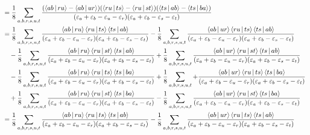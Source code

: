\documentclass[a4paper]{article}
\numberwithin{equation}{subsection}
\begin{document}
\begin{align}
&=\dfrac{1}{8} \sum_{a,b,r,s,u,t} \dfrac{(\Braket{ab|ru}-\Braket{ab|ur}) (\Braket{ru|ts}-\Braket{ru|st}) (\Braket{ts|ab}-\Braket{ts|ba})}{(\varepsilon_a + \varepsilon_b - \varepsilon_u - \varepsilon_r)(\varepsilon_a + \varepsilon_b - \varepsilon_s - \varepsilon_t)}  \notag\\
&= \dfrac{1}{8} \sum_{a,b,r,s,u,t} \dfrac{\Braket{ab|ru} \Braket{ru|ts} \Braket{ts|ab}}{(\varepsilon_a + \varepsilon_b - \varepsilon_u - \varepsilon_r)(\varepsilon_a + \varepsilon_b - \varepsilon_s - \varepsilon_t)} 
- \dfrac{1}{8} \sum_{a,b,r,s,u,t} \dfrac{\Braket{ab|ur} \Braket{ru|ts} \Braket{ts|ab}}{(\varepsilon_a + \varepsilon_b - \varepsilon_u - \varepsilon_r)(\varepsilon_a + \varepsilon_b - \varepsilon_s - \varepsilon_t)} \notag\\
&\quad{} - \dfrac{1}{8} \sum_{a,b,r,s,u,t} \dfrac{\Braket{ab|ru} \Braket{ru|st} \Braket{ts|ab}}{(\varepsilon_a + \varepsilon_b - \varepsilon_u - \varepsilon_r)(\varepsilon_a + \varepsilon_b - \varepsilon_s - \varepsilon_t)} 
+ \dfrac{1}{8} \sum_{a,b,r,s,u,t} \dfrac{\Braket{ab|ur} \Braket{ru|st} \Braket{ts|ab}}{(\varepsilon_a + \varepsilon_b - \varepsilon_u - \varepsilon_r)(\varepsilon_a + \varepsilon_b - \varepsilon_s - \varepsilon_t)} 
\notag\\
&\quad{} - \dfrac{1}{8} \sum_{a,b,r,s,u,t} \dfrac{\Braket{ab|ru} \Braket{ru|ts} \Braket{ts|ba}}{(\varepsilon_a + \varepsilon_b - \varepsilon_u - \varepsilon_r)(\varepsilon_a + \varepsilon_b - \varepsilon_s - \varepsilon_t)} 
+ \dfrac{1}{8} \sum_{a,b,r,s,u,t} + \dfrac{\Braket{ab|ur} \Braket{ru|ts} \Braket{ts|ba}}{(\varepsilon_a + \varepsilon_b - \varepsilon_u - \varepsilon_r)(\varepsilon_a + \varepsilon_b - \varepsilon_s - \varepsilon_t)} \notag\\
&\quad{} + \dfrac{1}{8} \sum_{a,b,r,s,u,t} \dfrac{\Braket{ab|ru} \Braket{ru|st} \Braket{ts|ba}}{(\varepsilon_a + \varepsilon_b - \varepsilon_u - \varepsilon_r)(\varepsilon_a + \varepsilon_b - \varepsilon_s - \varepsilon_t)} 
- \dfrac{1}{8} \sum_{a,b,r,s,u,t} \dfrac{\Braket{ab|ur} \Braket{ru|st} \Braket{ts|ba}}{(\varepsilon_a + \varepsilon_b - \varepsilon_u - \varepsilon_r)(\varepsilon_a + \varepsilon_b - \varepsilon_s - \varepsilon_t)}  \notag\\
&= \dfrac{1}{8} \sum_{a,b,r,s,u,t} \dfrac{\Braket{ab|ru} \Braket{ru|ts} \Braket{ts|ab}}{(\varepsilon_a + \varepsilon_b - \varepsilon_u - \varepsilon_r)(\varepsilon_a + \varepsilon_b - \varepsilon_s - \varepsilon_t)} 
- \dfrac{1}{8} \sum_{a,b,r,s,u,t} \dfrac{\Braket{ab|ur} \Braket{ru|ts} \Braket{ts|ab}}{(\varepsilon_a + \varepsilon_b - \varepsilon_u - \varepsilon_r)(\varepsilon_a + \varepsilon_b - \varepsilon_s - \varepsilon_t)} \notag\\

\end{align}
\end{document}
